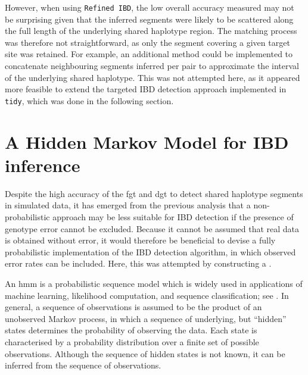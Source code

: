 
However, when using \texttt{Refined\,IBD}, the low overall accuracy measured may not be surprising given that the inferred segments were likely to be scattered along the full length of the underlying shared haplotype region.
The matching process was therefore not straightforward, as only the segment covering a given target site was retained.
For example, an additional method could be implemented to concatenate neighbouring segments inferred per pair to approximate the interval of the underlying shared haplotype.
This was not attempted here, as it appeared more feasible to extend the targeted IBD detection approach implemented in \texttt{tidy}, which was done in the following section.



%
\section{A Hidden Markov Model for IBD inference}
\label{sec:ibd_hmm_method}
%

Despite the high accuracy of the \gls{fgt} and \gls{dgt} to detect shared haplotype segments in simulated data, it has emerged from the previous analysis that a non-probabilistic approach may be less suitable for IBD detection if the presence of genotype error cannot be excluded.
Because it cannot be assumed that real data is obtained without error, it would therefore be beneficial to devise a fully probabilistic implementation of the IBD detection algorithm, in which observed error rates can be included.
Here, this was attempted by constructing a .

An \gls{hmm} is a probabilistic sequence model which is widely used in applications of machine learning, likelihood computation, and sequence classification; see \citet{Rabiner:1989hs}.
In general, a sequence of observations is assumed to be the product of an unobserved Markov process, in which a sequence of underlying, but ``hidden'' states determines the probability of observing the data.
Each state is characterised by a probability distribution over a finite set of possible observations.
Although the sequence of hidden states is not known, it can be inferred from the sequence of observations.

